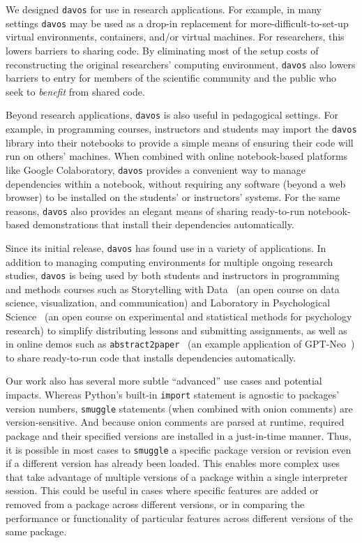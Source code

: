 \documentclass[preprint,12pt,a4paper]{elsarticle}
\begin{document}
We designed \texttt{davos} for use in research applications. For
example, in many settings \texttt{davos} may be used as a drop-in
replacement for more-difficult-to-set-up virtual environments,
containers, and/or virtual machines. For researchers, this lowers
barriers to sharing code. By eliminating most of the setup costs
of reconstructing the original researchers' computing environment,
\texttt{davos} also lowers barriers to entry for members of
the scientific community and the public who seek to \textit{benefit}
from shared code.

Beyond research applications, \texttt{davos} is also useful in
pedagogical settings. For example, in programming courses,
instructors and students may import the \texttt{davos} library into
their notebooks to provide a simple means of ensuring their code will
run on others' machines. When combined with online notebook-based
platforms like Google Colaboratory, \texttt{davos} provides a
convenient way to manage dependencies within a notebook, without
requiring any software (beyond a web browser) to be installed on the
students' or instructors' systems. For the same reasons,
\texttt{davos} also provides an elegant means of sharing ready-to-run
notebook-based demonstrations that install their dependencies
automatically.

Since its initial release, \texttt{davos} has found use in a variety
of applications. In addition to managing computing environments
for multiple ongoing research studies, \texttt{davos} is being used by
both students and instructors in programming and methods courses such as
Storytelling with Data~\cite{Mann21d} (an open course on data science,
visualization, and communication) and Laboratory in Psychological
Science~\cite{Mann22} (an open course on experimental and statistical
methods for psychology research) to simplify distributing lessons and
submitting assignments, as well as in online demos such as
\texttt{abstract2paper}~\cite{Mann21e} (an example application of
GPT-Neo~\cite{GaoEtal20, BlacEtal21}) to share ready-to-run code that
installs dependencies automatically.

Our work also has several more subtle ``advanced'' use cases and
potential impacts. Whereas Python's built-in \texttt{import}
statement is agnostic to packages' version numbers, \texttt{smuggle}
statements (when combined with onion comments) are version-sensitive.
And because onion comments are parsed at runtime, required package and
their specified versions are installed in a just-in-time manner. Thus, it is possible
in most cases to \texttt{smuggle} a specific package version or revision even if
a different version has already been loaded. This enables more complex uses
that take advantage of multiple versions of a package within a single interpreter
session. This could be useful in cases where specific features are added or
removed from a package across different versions, or in comparing the
performance or functionality of particular features across different versions of
the same package.
\end{document}
